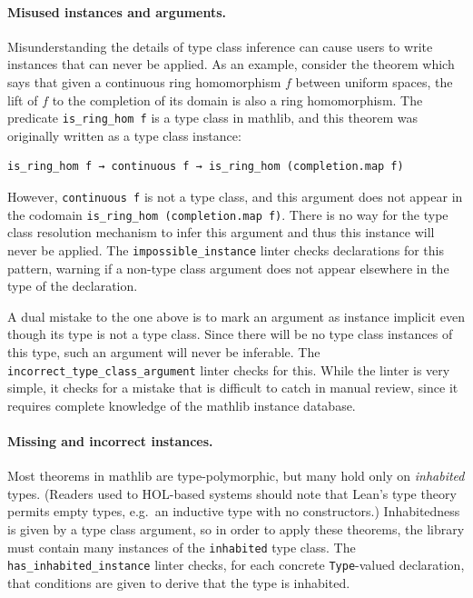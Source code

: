 \documentclass[runningheads]{llncs}
\newcommand{\mathlib}{\textsf{mathlib}\xspace}
\newcommand{\lean}[1]{\lstinline[language=lean]{#1}}
\begin{document}
\paragraph{Misused instances and arguments.}
Misunderstanding the details of type class inference
can cause users to write instances that can never be applied.
As an example, consider the theorem which says that
given a continuous ring homomorphism $f$ between uniform spaces,
the lift of $f$ to the completion of its domain is also a ring homomorphism.
The predicate \lean{is_ring_hom f} is a type class in \mathlib,
and this theorem was originally written as a type class instance:
\begin{lstlisting}
is_ring_hom f → continuous f → is_ring_hom (completion.map f)
\end{lstlisting}
However, \lean{continuous f} is not a type class,
and this argument does not appear in the codomain \lean{is_ring_hom (completion.map f)}.
There is no way for the type class resolution mechanism to infer this argument
and thus this instance will never be applied.
The \lean{impossible_instance} linter checks declarations for this pattern,
warning if a non-type class argument does not appear
elsewhere in the type of the declaration.

A dual mistake to the one above is
to mark an argument as instance implicit
even though its type is not a type class.
Since there will be no type class instances of this type,
such an argument will never be inferable.
The \lean{incorrect_type_class_argument} linter checks for this.
While the linter is very simple,
it checks for a mistake that is difficult to catch in manual review,
since it requires complete knowledge of the \mathlib instance database.

\paragraph{Missing and incorrect instances.}
Most theorems in \mathlib are type-polymorphic,
but many hold only on \emph{inhabited} types.
(Readers used to HOL-based systems should note that
Lean's type theory permits empty types,
e.g.\ an inductive type with no constructors.)
Inhabitedness is given by a type class argument,
so in order to apply these theorems,
the library must contain
many instances of the \lean{inhabited} type class.
The \lean{has_inhabited_instance} linter checks,
for each concrete \lean{Type}-valued declaration,
that conditions are given to derive
that the type is inhabited.
\end{document}
